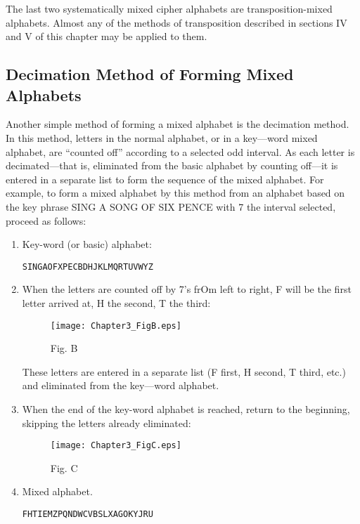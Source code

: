 \mypara The last two systematically mixed cipher alphabets are transposition-mixed alphabets. Almost any of the methods of transposition
described in sections IV and V of this chapter may be applied to them.

\subsection{Decimation Method of Forming Mixed Alphabets}

Another simple method of forming a mixed alphabet is the decimation
method. In this method, letters in the normal alphabet, or in a key—word
mixed alphabet, are “counted off” according to a selected odd interval.
As each letter is decimated—that is, eliminated from the basic alphabet
by counting off—it is entered in a separate list to form the sequence of
the mixed alphabet. For example, to form a mixed alphabet by this
method from an alphabet based on the key phrase SING A SONG OF
SIX PENCE with 7 the interval selected, proceed as follows:

\begin{enumerate}[label=\alph*]
\item Key-word (or basic) alphabet:

        \begin{verbatim}
SINGAOFXPECBDHJKLMQRTUVWYZ
        \end{verbatim}

\item When the letters are counted off by 7’s frOm left to right, F will
be the first letter arrived at, H the second, T the third:


\begin{figure}[h]
 \centering
 \texttt{[image: Chapter3\_FigB.eps]}
 \caption{Fig. B}
\end{figure}

These letters are entered in a separate list (F ﬁrst, H second, T third,
etc.) and eliminated from the key—word alphabet.

\item When the end of the key-word alphabet is reached, return to the
beginning, skipping the letters already eliminated:
\begin{figure}[h]
 \centering
 \texttt{[image: Chapter3\_FigC.eps]}
 \caption{Fig. C}
\end{figure}

\item Mixed alphabet.

        \begin{verbatim}
FHTIEMZPQNDWCVBSLXAGOKYJRU
        \end{verbatim}
\end{enumerate}

